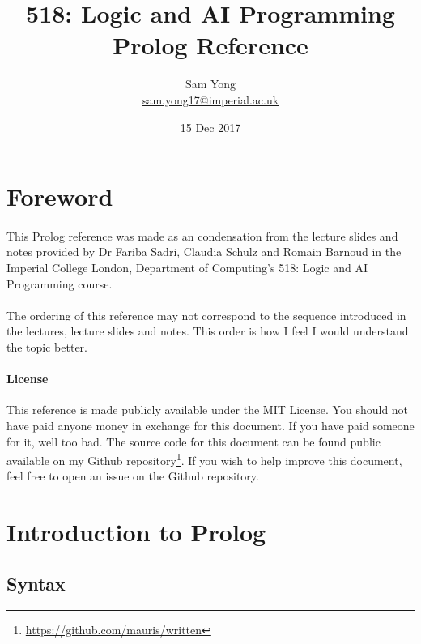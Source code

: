 \documentclass{article}
\title{
	 \large 518: Logic and AI Programming \\
	 \huge Prolog Reference
}
\date{15 Dec 2017}
\author{
	Sam Yong \\
	\small \href{mailto:sam.yong17@imperial.ac.uk}{sam.yong17@imperial.ac.uk}
}
\begin{document}
  \maketitle
  
  \begin{multicols}{2}
  
  \section*{Foreword}  
  
  \paragraph{} This Prolog reference was made as an condensation from the lecture slides and notes provided by Dr Fariba Sadri, Claudia Schulz and Romain Barnoud in the Imperial College London, Department of Computing's 518: Logic and AI Programming course.
  
  \paragraph{} The ordering of this reference may not correspond to the sequence introduced in the lectures, lecture slides and notes. This order is how I feel I would understand the topic better.
  
  \begin{footnotesize}
  \paragraph{License} This reference is made publicly available under the MIT License. You should not have paid anyone money in exchange for this document. If you have paid someone for it, well too bad. The source code for this document can be found public available on my Github repository\footnote{\href{https://github.com/mauris/written}{https://github.com/mauris/written}}. If you wish to help improve this document, feel free to open an issue on the Github repository.
  \end{footnotesize}
  
  \section{Introduction to Prolog}
  
  \subsection{Syntax}
  

\end{multicols}
\end{document}
